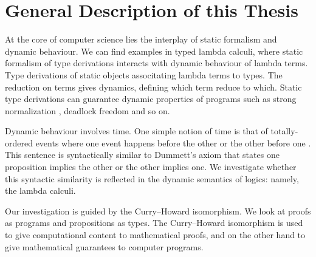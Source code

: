 \section{General Description of this Thesis}





At the core of computer science lies the interplay of static formalism
and dynamic behaviour.  We can find examples in typed lambda calculi,
where static formalism of type derivations interacts with dynamic
behaviour of lambda terms.
Type derivations of static objects associtating lambda terms to types.
The reduction on terms gives dynamics, defining which term reduce
to which.  Static type derivations can guarantee dynamic properties of
programs such as strong normalization ,
deadlock freedom 
and so on.

Dynamic behaviour involves time.
One simple notion of time is that of totally-ordered events where
one event happens before the other or the other before one .
This sentence is syntactically similar to Dummett's axiom that states
one proposition implies the other or the other implies one.
We investigate whether this syntactic similarity is reflected
in the dynamic semantics of logics: namely, the lambda calculi.


Our investigation is guided by the Curry--Howard isomorphism.
We look at proofs as programs and propositions as types.
The Curry--Howard isomorphism is used to give computational content
to mathematical proofs, and on the other hand to give mathematical
guarantees to computer programs.


